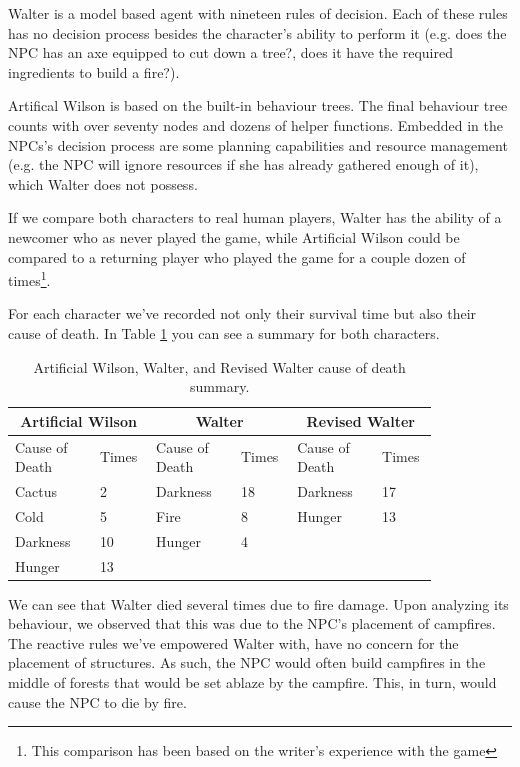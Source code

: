 Walter is a model based agent with nineteen rules of decision.
Each of these rules has no decision process besides the character's ability to perform it (e.g. does the \ac{NPC} has an axe equipped to cut down a tree?, does it have the required ingredients to build a fire?).

Artifical Wilson is based on the built-in behaviour trees.
The final behaviour tree counts with over seventy nodes and dozens of helper functions.
Embedded in the \acp{NPC}'s decision process are some planning capabilities and resource management (e.g. the \ac{NPC} will ignore resources if she has already gathered enough of it), which Walter does not possess.

If we compare both characters to real human players, Walter has the ability of a newcomer who as never played the game, while Artificial Wilson could be compared to a returning player who played the game for a couple dozen of times\footnote{This comparison has been based on the writer's experience with the game}.

For each character we've recorded not only their survival time but also their cause of death.
In Table \ref{tab:cod} you can see a summary for both characters.

\begin{table}[htb]
	\centering
    \caption{Artificial Wilson, Walter, and Revised Walter cause of death summary.}
    \label{tab:cod}
    \begin{tabular}{ | p{0.18\linewidth} | p{0.1\linewidth} | p{0.18\linewidth} | p{0.1\linewidth} | p{0.18\linewidth} | p{0.1\linewidth} |}
        \hline 
        \multicolumn{2}{|c|}{Artificial Wilson} & \multicolumn{2}{|c|}{Walter} & \multicolumn{2}{|c|}{Revised Walter} \\ \hline 
        Cause of Death & Times & Cause of Death & Times & Cause of Death & Times \\ \hline
        Cactus & 2 & Darkness & 18 & Darkness & 17 \\ \hline
        Cold & 5 & Fire & 8 & Hunger & 13 \\ \hline
        Darkness & 10 & Hunger & 4 & & \\ \hline
        Hunger & 13 & & & & \\ \hline
    \end{tabular}
\end{table}

We can see that Walter died several times due to fire damage.
Upon analyzing its behaviour, we observed that this was due to the \ac{NPC}'s placement of campfires.
The reactive rules we've empowered Walter with, have no concern for the placement of structures.
As such, the \ac{NPC} would often build campfires in the middle of forests that would be set ablaze by the campfire. This, in turn, would cause the \ac{NPC} to die by fire.

